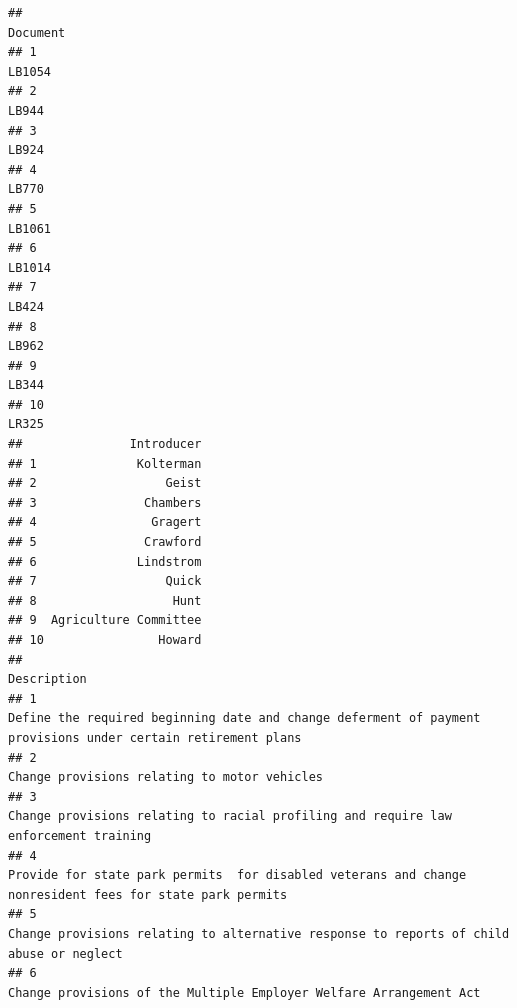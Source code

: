 \documentclass[]{book}
\begin{document}
\begin{verbatim}
##                                                                 Document
## 1                                                                 LB1054
## 2                                                                  LB944
## 3                                                                  LB924
## 4                                                                  LB770
## 5                                                                 LB1061
## 6                                                                 LB1014
## 7                                                                  LB424
## 8                                                                  LB962
## 9                                                                  LB344
## 10                                                                 LR325
##               Introducer
## 1              Kolterman
## 2                  Geist
## 3               Chambers
## 4                Gragert
## 5               Crawford
## 6              Lindstrom
## 7                  Quick
## 8                   Hunt
## 9  Agriculture Committee
## 10                Howard
##                                                                                                                                                                                                            Description
## 1                                                                                                         Define the required beginning date and change deferment of payment provisions under certain retirement plans
## 2                                                                                                                                                                         Change provisions relating to motor vehicles
## 3                                                                                                                                  Change provisions relating to racial profiling and require law enforcement training
## 4                                                                                                             Provide for state park permits  for disabled veterans and change nonresident fees for state park permits
## 5                                                                                                                              Change provisions relating to alternative response to reports of child abuse or neglect
## 6                                                                                                                                                   Change provisions of the Multiple Employer Welfare Arrangement Act

\end{verbatim}
\end{document}
